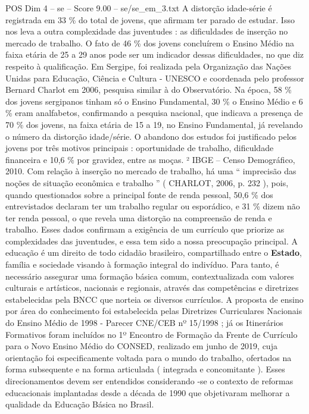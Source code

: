 \begin{textsample}{POS Dim 4 – se – Score 9.00 – se/se\_em\_3.txt}
A distorção idade-série é registrada em 33 \% do total de jovens, que afirmam ter parado de estudar.
Isso nos leva a outra complexidade das juventudes : as dificuldades de inserção no mercado de trabalho.
O fato de 46 \% dos jovens concluírem o Ensino Médio na faixa etária de 25 a 29 anos pode ser um indicador dessas dificuldades, no que diz respeito à qualificação.
Em Sergipe, foi realizada pela Organização das Nações Unidas para Educação, Ciência e Cultura - UNESCO e coordenada pelo professor Bernard Charlot em 2006, pesquisa similar à do Observatório.
Na época, 58 \% dos jovens sergipanos tinham só o Ensino Fundamental, 30 \% o Ensino Médio e 6 \% eram analfabetos, confirmando a pesquisa nacional, que indicava a presença de 70 \% dos jovens, na faixa etária de 15 a 19, no Ensino Fundamental, já revelando o número da distorção idade/série.
O abandono dos estudos foi justificado pelos jovens por três motivos principais : oportunidade de trabalho, dificuldade financeira e 10,6 \% por gravidez, entre as moças. ² IBGE – Censo Demográfico, 2010.
Com relação à inserção no mercado de trabalho, há uma “ imprecisão das noções de situação econômica e trabalho ” ( CHARLOT, 2006, p. 232 ), pois, quando questionados sobre a principal fonte de renda pessoal, 50,6 \% dos entrevistados declaram ter um trabalho regular ou esporádico, e 31 \% dizem não ter renda pessoal, o que revela uma distorção na compreensão de renda e trabalho.
Esses dados confirmam a exigência de um currículo que priorize as complexidades das juventudes, e essa tem sido a nossa preocupação principal.
A educação é um direito de todo cidadão brasileiro, compartilhado entre o \textbf{Estado}, família e sociedade visando à formação integral do indivíduo.
Para tanto, é necessário assegurar uma formação básica comum, contextualizada com valores culturais e artísticos, nacionais e regionais, através das competências e diretrizes estabelecidas pela BNCC que norteia os diversos currículos.
A proposta de ensino por área do conhecimento foi estabelecida pelas Diretrizes Curriculares Nacionais do Ensino Médio de 1998 - Parecer CNE/CEB nº 15/1998 ; já os Itinerários Formativos foram incluídos no 1º Encontro de Formação da Frente de Currículo para o Novo Ensino Médio do CONSED, realizado em junho de 2019, cuja orientação foi especificamente voltada para o mundo do trabalho, ofertados na forma subsequente e na forma articulada ( integrada e concomitante ).
Esses direcionamentos devem ser entendidos considerando -se o contexto de reformas educacionais implantadas desde a década de 1990 que objetivaram melhorar a qualidade da Educação Básica no Brasil.

\end{textsample}
